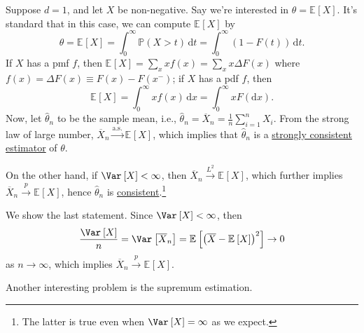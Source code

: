 \begin{eg}
	Suppose \(d = 1\), and let \(X\) be non-negative. Say we're interested in \(\theta = \mathbb{E}_{}\left[X \right] \). It's standard that in this case, we can compute \(\mathbb{E}_{}\left[X \right] \) by
	\[
		\theta
		= \mathbb{E}_{}\left[X \right]
		= \int_{0}^{\infty} \mathbb{P} (X > t) \,\mathrm{d}t
		= \int_{0}^{\infty} (1 - F(t)) \,\mathrm{d}t.
	\]
	If \(X\) has a pmf \(f\), then \(\mathbb{E}_{}\left[X \right] = \sum_{x} x f(x) = \sum_{x} x \Delta F(x)\) where \(f(x) = \Delta F(x) \equiv F(x) - F(x^-)\); if \(X\) has a pdf \(f\), then
	\[
		\mathbb{E}_{}\left[X \right]
		= \int_{0}^{\infty} x f(x) \,\mathrm{d}x
		= \int_{0}^{\infty} x F(\mathrm{d}x).
	\]
	Now, let \(\hat{\theta} _n\) to be the sample mean, i.e., \(\hat{\theta} _n = \overline{X} _n = \frac{1}{n} \sum_{i=1}^{n} X_i\). From the strong law of large number, \(\overline{X} _n \overset{\text{a.s.} }{\to } \mathbb{E}_{}\left[ X \right] \), which implies that \(\hat{\theta} _n\) is a \hyperref[def:strongly-consistent]{strongly consistent estimator} of \(\theta \).

	On the other hand, if \(\Var_{}\left[X \right] < \infty \), then \(\overline{X} _n \overset{L^2}{\to } \mathbb{E}_{}\left[X \right] \), which further implies \(\overline{X} _n \overset{p}{\to } \mathbb{E}_{}\left[X \right] \), hence \(\hat{\theta} _n\) is \hyperref[def:consistent]{consistent}.\footnote{The latter is true even when \(\Var_{}\left[X \right] = \infty \) as we expect.}
\end{eg}
\begin{explanation}
	We show the last statement. Since \(\Var_{}\left[X \right] < \infty \), then
	\[
		\frac{\Var_{}\left[X \right] }{n}
		= \Var_{}\left[\overline{X} _n \right]
		= \mathbb{E}_{}\left[ \left( \overline{X} - \mathbb{E}_{}\left[X \right]  \right) ^2 \right]
		\to 0
	\]
	as \(n \to \infty \), which implies \(\overline{X} _n \overset{p}{\to } \mathbb{E}_{}\left[X \right] \).
\end{explanation}

Another interesting problem is the supremum estimation.

